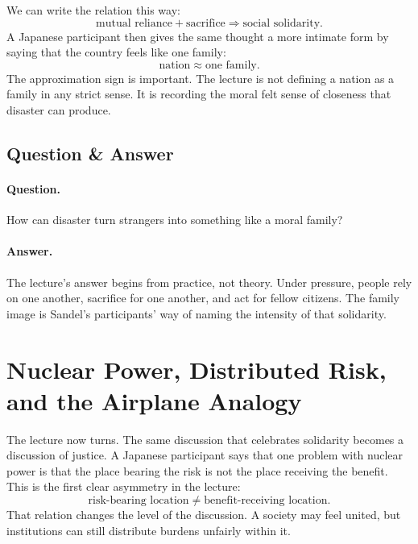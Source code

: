 We can write the relation this way:
\begin{equation}
\text{mutual reliance} + \text{sacrifice}
\Longrightarrow
\text{social solidarity}.
\end{equation}
A Japanese participant then gives the same thought a more intimate form by saying that the country feels like one family:
\begin{equation}
\text{nation}
\approx
\text{one family}.
\end{equation}
The approximation sign is important. The lecture is not defining a nation as a family in any strict sense. It is recording the moral felt sense of closeness that disaster can produce.

\subsection{Question \& Answer}

\paragraph{Question.} How can disaster turn strangers into something like a moral family?

\paragraph{Answer.} The lecture's answer begins from practice, not theory. Under pressure, people rely on one another, sacrifice for one another, and act for fellow citizens. The family image is Sandel's participants' way of naming the intensity of that solidarity.

\section{Nuclear Power, Distributed Risk, and the Airplane Analogy}

The lecture now turns. The same discussion that celebrates solidarity becomes a discussion of justice. A Japanese participant says that one problem with nuclear power is that the place bearing the risk is not the place receiving the benefit. This is the first clear asymmetry in the lecture:
\begin{equation}
\text{risk-bearing location}
\neq
\text{benefit-receiving location}.
\end{equation}
That relation changes the level of the discussion. A society may feel united, but institutions can still distribute burdens unfairly within it.

